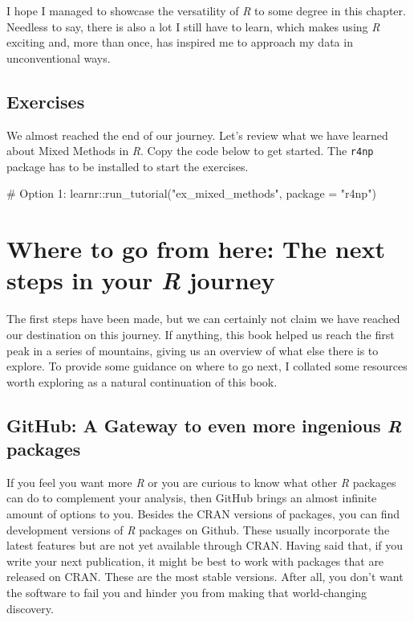 \documentclass[
  letterpaper,
  DIV=11,
  numbers=noendperiod]{scrreprt}
\newenvironment{Shaded}{\begin{snugshade}}{\end{snugshade}}
\newcommand{\AttributeTok}[1]{\textcolor[rgb]{0.40,0.45,0.13}{#1}}
\newcommand{\CommentTok}[1]{\textcolor[rgb]{0.37,0.37,0.37}{#1}}
\newcommand{\FunctionTok}[1]{\textcolor[rgb]{0.28,0.35,0.67}{#1}}
\newcommand{\NormalTok}[1]{\textcolor[rgb]{0.00,0.23,0.31}{#1}}
\newcommand{\SpecialCharTok}[1]{\textcolor[rgb]{0.37,0.37,0.37}{#1}}
\newcommand{\StringTok}[1]{\textcolor[rgb]{0.13,0.47,0.30}{#1}}
\begin{document}
I hope I managed to showcase the versatility of \emph{R} to some degree
in this chapter. Needless to say, there is also a lot I still have to
learn, which makes using \emph{R} exciting and, more than once, has
inspired me to approach my data in unconventional ways.

\section{Exercises}\label{sec-exercises-mixed-methods}

We almost reached the end of our journey. Let's review what we have
learned about Mixed Methods in \emph{R}. Copy the code below to get
started. The \texttt{r4np} package has to be installed to start the
exercises.

\begin{Shaded}
\begin{Highlighting}[]
\CommentTok{\# Option 1:}
\NormalTok{learnr}\SpecialCharTok{::}\FunctionTok{run\_tutorial}\NormalTok{(}\StringTok{"ex\_mixed\_methods"}\NormalTok{, }\AttributeTok{package =} \StringTok{"r4np"}\NormalTok{)}
\end{Highlighting}
\end{Shaded}


\chapter{\texorpdfstring{Where to go from here: The next steps in your
\emph{R}
journey}{Where to go from here: The next steps in your R journey}}\label{sec-next-steps}

The first steps have been made, but we can certainly not claim we have
reached our destination on this journey. If anything, this book helped
us reach the first peak in a series of mountains, giving us an overview
of what else there is to explore. To provide some guidance on where to
go next, I collated some resources worth exploring as a natural
continuation of this book.

\section{\texorpdfstring{GitHub: A Gateway to even more ingenious
\emph{R}
packages}{GitHub: A Gateway to even more ingenious R packages}}\label{sec-next-steps-github}

If you feel you want more \emph{R} or you are curious to know what other
\emph{R} packages can do to complement your analysis, then GitHub brings
an almost infinite amount of options to you. Besides the CRAN versions
of packages, you can find development versions of \emph{R} packages on
Github. These usually incorporate the latest features but are not yet
available through CRAN. Having said that, if you write your next
publication, it might be best to work with packages that are released on
CRAN. These are the most stable versions. After all, you don't want the
software to fail you and hinder you from making that world-changing
discovery.
\end{document}
